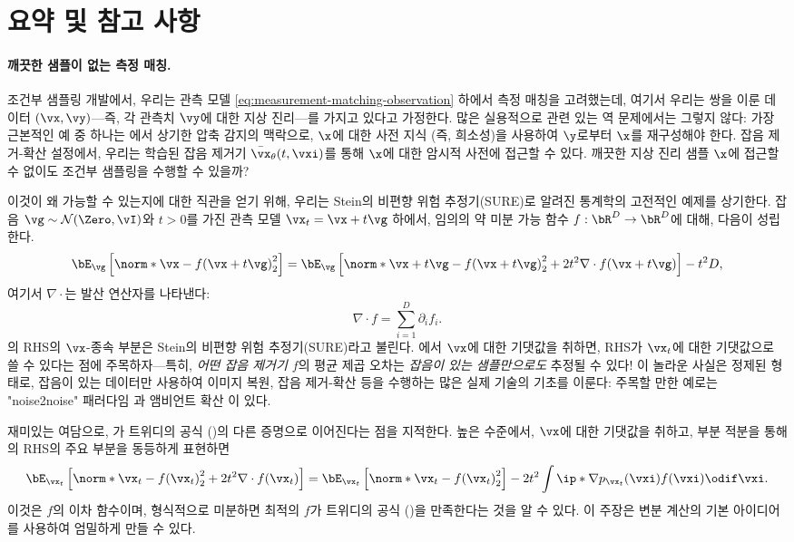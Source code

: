 \documentclass[../../book-main_ko.tex]{subfiles}
\begin{document}
\section{요약 및 참고 사항}
\paragraph{깨끗한 샘플이 없는 측정 매칭.} 조건부 샘플링 개발에서, 우리는 관측 모델 \eqref{eq:measurement-matching-observation} 하에서 측정 매칭을 고려했는데, 여기서 우리는 쌍을 이룬 데이터 $(\vx, \vy)$—즉, 각 관측치 $\vy$에 대한 지상 진리—를 가지고 있다고 가정한다.
많은 실용적으로 관련 있는 역 문제에서는 그렇지 않다: 가장 근본적인 예 중 하나는 에서 상기한 압축 감지의 맥락으로, $\x$에 대한 사전 지식 (즉, 희소성)을 사용하여 $\y$로부터 $\x$를 재구성해야 한다.
잡음 제거-확산 설정에서, 우리는 학습된 잡음 제거기 $\bar{\vx}_{\theta}(t, \vxi)$를 통해 $\x$에 대한 암시적 사전에 접근할 수 있다. 깨끗한 지상 진리 샘플 $\x$에 접근할 수 없이도 조건부 샘플링을 수행할 수 있을까?

이것이 왜 가능할 수 있는지에 대한 직관을 얻기 위해, 우리는 Stein의 비편향 위험 추정기(SURE)로 알려진 통계학의 고전적인 예제를 상기한다.
잡음 $\vg \sim \mathcal{N}(\Zero, \vI)$와 $t>0$를 가진 관측 모델 $\vx_t = \vx + t \vg$ 하에서, 임의의 약 미분 가능 함수 $f : \bR^D \to \bR^D$에 대해, 다음이 성립한다.
\begin{equation}\label{eq:sure-risk}
  \bE_{\vg}\left[
    \norm*{\vx - f(\vx + t \vg)}_2^2\right]
  = 
  \bE_{\vg}\left[
    \norm*{\vx+t\vg - f(\vx + t \vg)}_2^2
    + 2t^2 \nabla \cdot f(\vx + t\vg)\right]
    - t^2 D,
\end{equation}
여기서 $\nabla \cdot$는 발산 연산자를 나타낸다:
\begin{equation*} \nabla \cdot f = \sum_{i=1}^D \partial_i f_i.
\end{equation*} 
의 RHS의 $\vx$-종속 부분은 Stein의 비편향 위험 추정기(SURE)라고 불린다. 에서 $\vx$에 대한 기댓값을 취하면, RHS가 $\vx_t$에 대한 기댓값으로 쓸 수 있다는 점에 주목하자—특히, \textit{어떤 잡음 제거기 $f$}의 평균 제곱 오차는 \textit{잡음이 있는 샘플만으로도} 추정될 수 있다!
이 놀라운 사실은 정제된 형태로, 잡음이 있는 데이터만 사용하여 이미지 복원, 잡음 제거-확산 등을 수행하는 많은 실제 기술의 기초를 이룬다: 주목할 만한 예로는 "noise2noise" 패러다임 \cite{pmlr-v80-lehtinen18a}과 앰비언트 확산 \cite{daras2023ambient}이 있다.

재미있는 여담으로, 가 트위디의 공식 ()의 다른 증명으로 이어진다는 점을 지적한다. 높은 수준에서, $\vx$에 대한 기댓값을 취하고, 부분 적분을 통해 의 RHS의 주요 부분을 동등하게 표현하면
\begin{equation}
  \bE_{\vx_t}\left[
    \norm*{\vx_t - f(\vx_t)}_2^2
    + 2t^2 \nabla \cdot f(\vx_t)
    \right]
  = 
  \bE_{\vx_t}\left[
    \norm*{\vx_t - f(\vx_t)}_2^2
    \right]
  - 2t^2 \int
  \ip*{\nabla p_{\vx_t}(\vxi)}{f(\vxi)}
  \odif \vxi.
\end{equation}
이것은 $f$의 이차 함수이며, 형식적으로 미분하면 최적의 $f$가 트위디의 공식 ()을 만족한다는 것을 알 수 있다. 이 주장은 변분 계산의 기본 아이디어를 사용하여 엄밀하게 만들 수 있다.
\end{document}
